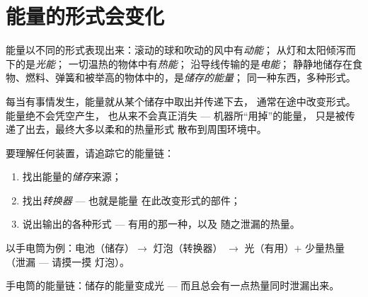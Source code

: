 \section{能量的形式会变化}

\begin{example}[能量的形式]\label{ex:g5:everyday-energy:forms}
能量以不同的形式表现出来：滚动的球和吹动的风中有\emph{动能}；
从灯和太阳倾泻而下的是\emph{光能}；
一切温热的物体中有\emph{热能}；
沿导线传输的是\emph{电能}；
静静地储存在食物、燃料、弹簧和被举高的物体中的，是\emph{储存的能量}；
同一种东西，多种形式。
\end{example}

\begin{proposition}[能量链]\label{prop:g5:everyday-energy:chain}
每当有事情发生，能量就从某个储存中取出并传递下去，
通常在途中改变形式。能量绝不会凭空产生，
也从来不会真正消失 --- 机器所“用掉”的能量，
只是被传递了出去，最终大多以柔和的热量形式
散布到周围环境中。
\end{proposition}

\begin{method}[阅读能量链]\label{met:g5:everyday-energy:read}
要理解任何装置，请追踪它的能量链：
\begin{enumerate}
  \item 找出能量的\emph{储存}来源；
  \item 找出\emph{转换器} --- 也就是能量
        在此改变形式的部件；
  \item 说出输出的各种形式 --- 有用的那一种，以及
        随之泄漏的热量。
\end{enumerate}
以手电筒为例：电池（储存）$\to$ 灯泡（转换器）
$\to$ 光（有用）$+$ 少量热量（泄漏 --- 请摸一摸
灯泡）。
\end{method}

\begin{omfigure}

{\small 手电筒的能量链：储存的能量变成光
--- 而且总会有一点热量同时泄漏出来。}
\end{omfigure}

